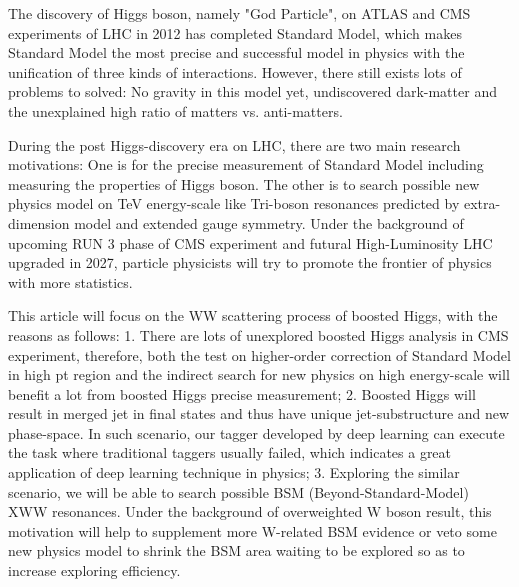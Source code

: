 \begin{eabstract}

    The discovery of Higgs boson, namely "God Particle", on ATLAS and CMS experiments of LHC in 2012 has completed Standard Model, which makes Standard Model the most precise and successful model in physics with the unification of three kinds of interactions. However, there still exists lots of problems to solved: No gravity in this model yet, undiscovered dark-matter and the unexplained high ratio of matters vs. anti-matters.
    
    During the post Higgs-discovery era on LHC, there are two main research motivations: One is for the precise measurement of Standard Model including measuring the properties of Higgs boson. The other is to search possible new physics model on TeV energy-scale like Tri-boson resonances predicted by extra-dimension model and extended gauge symmetry. Under the background of upcoming RUN 3 phase of CMS experiment and futural High-Luminosity LHC upgraded in 2027, particle physicists will try to promote the frontier of physics with more statistics.
    
    This article will focus on the WW scattering process of boosted Higgs, with the reasons as follows: 1. There are lots of unexplored boosted Higgs analysis in CMS experiment, therefore, both the test on higher-order correction of Standard Model in high pt region and the indirect search for new physics on high energy-scale will benefit a lot from boosted Higgs precise measurement; 2. Boosted Higgs will result in merged jet in final states and thus have unique jet-substructure and new phase-space. In such scenario, our tagger developed by deep learning can execute the task where traditional taggers usually failed, which indicates a great application of deep learning technique in physics; 3. Exploring the similar scenario, we will be able to search possible BSM (Beyond-Standard-Model) XWW resonances. Under the background of overweighted W boson result, this motivation will help to supplement more W-related BSM evidence or veto some new physics model to shrink the BSM area waiting to be explored so as to increase exploring efficiency.
    

\end{eabstract}
